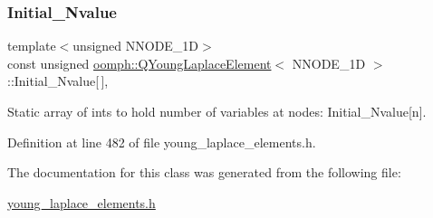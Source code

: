 \subsubsection{\texorpdfstring{Initial\+\_\+\+Nvalue}{Initial\_Nvalue}}
{\footnotesize\ttfamily template$<$unsigned N\+N\+O\+D\+E\+\_\+1D$>$ \\
const unsigned \hyperlink{classoomph_1_1QYoungLaplaceElement}{oomph\+::\+Q\+Young\+Laplace\+Element}$<$ N\+N\+O\+D\+E\+\_\+1D $>$\+::Initial\+\_\+\+Nvalue\mbox{[}$\,$\mbox{]}\hspace{0.3cm}{\ttfamily [static]}, {\ttfamily [private]}}



Static array of ints to hold number of variables at nodes\+: Initial\+\_\+\+Nvalue\mbox{[}n\mbox{]}. 



Definition at line 482 of file young\+\_\+laplace\+\_\+elements.\+h.



The documentation for this class was generated from the following file\+:\begin{DoxyCompactItemize}
\item 
\hyperlink{young__laplace__elements_8h}{young\+\_\+laplace\+\_\+elements.\+h}\end{DoxyCompactItemize}
